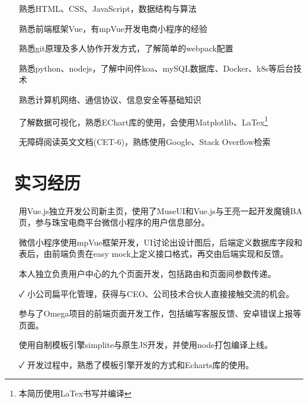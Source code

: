 \documentclass[14pt]{resume}
\begin{document}
\begin{itemize}
    \item[\faTree] 熟悉HTML、CSS、JavaScript，数据结构与算法
    \item[\faTree] 熟悉前端框架Vue，有mpVue开发电商小程序的经验
    \item[\faTree] 熟悉git原理及多人协作开发方式，了解简单的webpack配置
    \item[\faTree] 熟悉python、nodejs，了解中间件koa、mySQL数据库、Docker、k8s等后台技术
    \item[\faTree] 熟悉计算机网络、通信协议、信息安全等基础知识
    \item[\faTree] 了解数据可视化，熟悉EChart库的使用，会使用Matplotlib、LaTex\footnote{本简历使用LaTex书写并编译} 
    \item[\faTree] 无障碍阅读英文文档(CET-6)，熟练使用Google、Stack Overflow检索
\end{itemize}

\section{\faBriefcase\ 实习经历}

\begin{itemize}
    \item[\faFlagO] 用Vue.js独立开发公司新主页，使用了MuseUI和Vue.js与王亮一起开发魔镜BA页，参与珠宝电商平台微信小程序的用户信息部分。
    \item[\faFlagO] 微信小程序使用mpVue框架开发，UI讨论出设计图后，后端定义数据库字段和表后，由前端负责在easy mock上定义接口格式，再交由后端实现和反馈。
    \item[\faCode] 本人独立负责用户中心的九个页面开发，包括路由和页面间参数传递。 
    \item[\faCheck] 小公司扁平化管理，获得与CEO、公司技术合伙人直接接触交流的机会。
\end{itemize}


\begin{itemize}
    \item[\faFlagO] 参与了Omega项目的前端页面开发工作，包括编写客服反馈、安卓错误上报等页面。
    \item[\faCode] 使用自制模板引擎simplite与原生JS开发，并使用node打包编译上线。
    \item[\faCheck] 开发过程中，熟悉了模板引擎开发的方式和Echarts库的使用。
\end{itemize}
\end{document}
